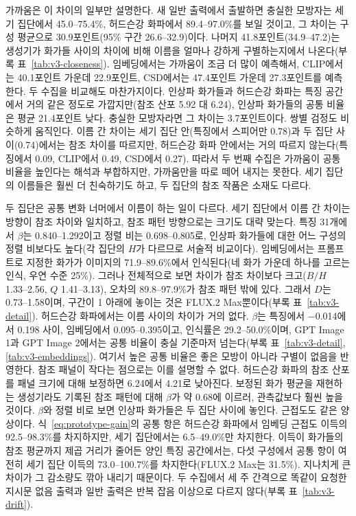 \documentclass[10pt]{article}
\begin{document}
가까움은 이 차이의 일부만 설명한다. 새 일반 출력에서 출발하면 충실한 모방자는 세기 집단에서
45.0--75.4\%, 허드슨강 화파에서 89.4--97.0\%를 보일 것이고, 그 차이는 구성 평균으로 30.9포인트(95\%
구간 26.6--32.9)이다. 나머지 41.8포인트(34.9--47.2)는 생성기가 화가들 사이의 차이에 비해 이름을 얼마나
강하게 구별하는지에서 나온다(부록 표~\ref{tab:v3-closeness}). 임베딩에서는 가까움이 조금 더 많이
예측해서, CLIP에서는 40.1포인트 가운데 22.9포인트, CSD에서는 47.4포인트 가운데 27.3포인트를
예측한다. 두 수집을 비교해도 마찬가지이다. 인상파 화가들과 허드슨강 화파는 특징 공간에서 거의 같은
정도로 가깝지만(참조 산포 5.92 대 6.24), 인상파 화가들의 공통 비율은 평균 21.4포인트 낮다. 충실한
모방자라면 그 차이는 3.7포인트이다. 쌍별 검정도 비슷하게 움직인다. 이름 간 차이는 세기 집단 안(특징에서
스피어만 0.78)과 두 집단 사이(0.74)에서는 참조 차이를 따르지만, 허드슨강 화파 안에서는 거의 따르지
않는다(특징에서 0.09, CLIP에서 0.49, CSD에서 0.27). 따라서 두 번째 수집은 가까움이 공통 비율을 높인다는
해석과 부합하지만, 가까움만을 따로 떼어 내지는 못한다. 세기 집단의 이름들은 훨씬 더 친숙하기도 하고,
두 집단의 참조 작품은 소재도 다르다.

두 집단은 공통 변화 너머에서 이름이 하는 일이 다르다. 세기 집단에서 이름 간 차이는 방향이 참조 차이와
일치하고, 참조 패턴 방향으로는 크기도 대략 맞는다. 특징 31개에서 $\beta$는 0.840--1.292이고 정렬 비는
0.698--0.805로, 인상파 화가들에 대한 어느 구성의 정렬 비보다도 높다(각 집단의 $H$가 다르므로 서술적
비교이다). 임베딩에서는 프롬프트로 지정한 화가가 이미지의 71.9--89.6\%에서 인식된다(네 화가 가운데
하나를 고르는 인식, 우연 수준 25\%). 그러나 전체적으로 보면 차이가 참조 차이보다 크고($B/H$
1.33--2.56, $Q$ 1.41--3.13), 오차의 89.8--97.9\%가 참조 패턴 밖에 있다. 그래서 $D$는 0.73--1.58이며,
구간이 1 아래에 놓이는 것은 FLUX.2 Max뿐이다(부록 표~\ref{tab:v3-detail}). 허드슨강 화파에서는 이름
사이의 차이가 거의 없다. $\beta$는 특징에서 $-$0.014에서 0.198 사이, 임베딩에서 0.095--0.395이고,
인식률은 29.2--50.0\%이며, GPT Image 1과 GPT Image 2에서는 공통 비율이 충실 기준마저 넘는다(부록
표~\ref{tab:v3-detail}, \ref{tab:v3-embeddings}). 여기서 높은 공통 비율은 좋은 모방이 아니라 구별이
없음을 반영한다. 참조 패널이 작다는 점으로는 이를 설명할 수 없다. 허드슨강 화파의 참조 산포를 패널
크기에 대해 보정하면 6.24에서 4.21로 낮아진다. 보정된 화가 평균을 재현하는 생성기라도 기록된 참조
패턴에 대해 $\beta$가 약 0.68에 이르러, 관측값보다 훨씬 높을 것이다. $\beta$와 정렬 비로 보면 인상파
화가들은 두 집단 사이에 놓인다. 근접도도 같은 양상이다. 식~\ref{eq:prototype-gain}의 공통 항은
허드슨강 화파에서 임베딩 근접도 이득의 92.5--98.3\%를 차지하지만, 세기 집단에서는 6.5--49.0\%만
차지한다. 이득이 화가들의 참조 평균까지 제곱 거리가 줄어든 양인 특징 공간에서는, 다섯 구성에서 공통
항이 여전히 세기 집단 이득의 73.0--100.7\%를 차지한다(FLUX.2 Max는 31.5\%). 지나치게 큰 차이가 그
감소량도 깎아 내리기 때문이다. 두 수집에서 세 주 간격으로 똑같이 요청한 지시문 없음 출력과 일반 출력은
반복 잡음 이상으로 다르지 않다(부록 표~\ref{tab:v3-drift}).
\end{document}
